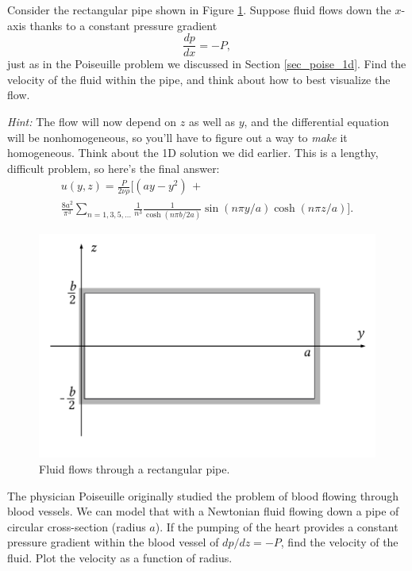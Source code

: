 \begin{problem}
\label{prob_poise_2d}
Consider the rectangular pipe shown in Figure \ref{fig_poise_2d_setup}.  Suppose fluid flows down the $x$-axis thanks to a constant pressure gradient 
\[
\frac{dp}{dx} = -P,
\]
just as in the Poiseuille problem we discussed in Section \ref{sec_poise_1d}.  Find the velocity of the fluid within the pipe, and think about how to best visualize the flow.  

\emph{Hint:} The flow will now depend on $z$ as well as $y$, and the differential equation will be nonhomogeneous, so you'll have to figure out a way to \emph{make} it homogeneous.  Think about the 1D solution we did earlier.  This is a lengthy, difficult problem, so here's the final answer:
\begin{multline}
u(y, z) =  \frac{P}{2\nu \rho} \Biggl[ (ay - y^2) \, +  \\  \frac{8a^2}{\pi^3} \sum_{n=1,3,5, \dots} \frac{1}{n^3} \frac{1}{\cosh (n\pi b / 2a)} \sin (n\pi y / a) \cosh(n \pi z / a) \Biggr].
\end{multline}
\end{problem}

\begin{figure}
\centering
\includegraphics[width=0.7\linewidth]{Figures/Chapter2/fig_poise_2d_setup}
\caption{Fluid flows through a rectangular pipe.}
\label{fig_poise_2d_setup}
\end{figure}


\begin{problem}
\label{prob_poise_cyl}
The physician Poiseuille originally studied the problem of blood flowing through blood vessels. We can model that with a Newtonian fluid flowing down a pipe of circular cross-section (radius $a$).  If the pumping of the heart provides a constant pressure gradient within the blood vessel of $dp/dz = -P$,  find the velocity of the fluid.  Plot the velocity as a function of radius.
\end{problem}

